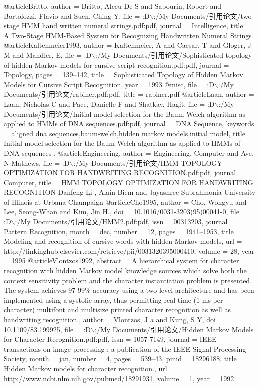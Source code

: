 @article{Britto,
author = {Britto, Alceu De S and Sabourin, Robert and Bortolozzi, Flavio and Suen, Ching Y},
file = {:D$\backslash$:/My Documents/引用论文/two-stage HMM hand written numeral strings.pdf:pdf},
journal = {Intelligence},
title = {{A Two-Stage HMM-Based System for Recognizing Handwritten Numeral Strings}}
}
@article{Kaltenmeier1993,
author = {Kaltenmeier, A and Caesar, T and Gloger, J M and Mandler, E},
file = {:D$\backslash$:/My Documents/引用论文/Sophisticated topology of hidden Markov models for cursive script recognition.pdf:pdf},
journal = {Topology},
pages = {139--142},
title = {{Sophisticated Topology of Hidden Markov Models for Cursive Script Recognition}},
year = {1993}
}
@misc{,
file = {:D$\backslash$:/My Documents/引用论文/rabiner.pdf:pdf},
title = {rabiner.pdf}
}
@article{Laan,
author = {Laan, Nicholas C and Pace, Danielle F and Shatkay, Hagit},
file = {:D$\backslash$:/My Documents/引用论文/Initial model selection for the Baum-Welch algorithm as applied to HMMs of DNA sequences.pdf:pdf},
journal = {DNA Sequence},
keywords = {aligned dna sequences,baum-welch,hidden markov models,initial model},
title = {{Initial model selection for the Baum-Welch algorithm as applied to HMMs of DNA sequences .}}
}
@article{Engineering,
author = {Engineering, Computer and Ave, N Mathews},
file = {:D$\backslash$:/My Documents/引用论文/HMM TOPOLOGY OPTIMIZATION FOR HANDWRITING RECOGNITION.pdf:pdf},
journal = {Computer},
title = {{HMM TOPOLOGY OPTIMIZATION FOR HANDWRITING RECOGNITION Danfeng Li , Alain Biem and Jayashree Subrahmonia University of Illinois at Urbana-Champaign}}
}
@article{Cho1995,
author = {Cho, Wongyu and Lee, Seong-Whan and Kim, Jin H.},
doi = {10.1016/0031-3203(95)00041-0},
file = {:D$\backslash$:/My Documents/引用论文/HMM2.pdf:pdf},
issn = {00313203},
journal = {Pattern Recognition},
month = dec,
number = {12},
pages = {1941--1953},
title = {{Modeling and recognition of cursive words with hidden Markov models}},
url = {http://linkinghub.elsevier.com/retrieve/pii/0031320395000410},
volume = {28},
year = {1995}
}
@article{Vlontzos1992,
abstract = {A hierarchical system for character recognition with hidden Markov model knowledge sources which solve both the context sensitivity problem and the character instantiation problem is presented. The system achieves 97-99\% accuracy using a two-level architecture and has been implemented using a systolic array, thus permitting real-time (1 ms per character) multifont and multisize printed character recognition as well as handwriting recognition.},
author = {Vlontzos, J a and Kung, S Y},
doi = {10.1109/83.199925},
file = {:D$\backslash$:/My Documents/引用论文/Hidden Markov Models for Character Recognition.pdf:pdf},
issn = {1057-7149},
journal = {IEEE transactions on image processing : a publication of the IEEE Signal Processing Society},
month = jan,
number = {4},
pages = {539--43},
pmid = {18296188},
title = {{Hidden Markov models for character recognition.}},
url = {http://www.ncbi.nlm.nih.gov/pubmed/18291931},
volume = {1},
year = {1992}
}
